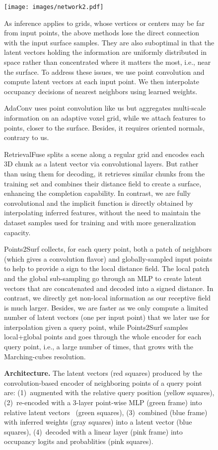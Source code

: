 \documentclass[10pt,twocolumn,letterpaper]{article}
\begin{document}
\begin{figure}[t]
\begin{figure*}
    \centering
    \texttt{[image: images/network2.pdf]}
    \vspace{-6mm}
    \caption{\textbf{Architecture.} The latent vectors  (red squares) produced by the convolution-based encoder  of  neighboring points  of a query point  are:
    (1)~augmented with the relative query position  (yellow squares), 
    (2)~re-encoded with a 3-layer point-wise MLP  (green frame) into relative latent vectors~ (green squares), 
    (3)~combined (blue frame) with inferred weights  (gray squares) into a latent vector  (blue squares),
    (4)~decoded with a linear layer  (pink frame) into occupancy logits  and probablities  (pink squares).
    } 
    \label{fig:decoder}
    \vspace{-2mm}
\end{figure*}


As inference applies to grids, whose vertices or centers may be far from input points, the above methods lose the direct connection with the input surface samples. They are also suboptimal in that the latent vectors holding the information are uniformly distributed in space rather than concentrated where it matters the most, i.e., near the surface.
To address these issues, we use point convolution and compute latent vectors at each input point. We then interpolate occupancy decisions of nearest neighbors using learned weights.

AdaConv \cite{Ummenhofer2021Adaptive} uses point convolution like us but aggregates multi-scale information on an adaptive voxel grid, while we attach features to points, closer to the surface. Besides, it requires oriented normals, contrary to us.

RetrievalFuse \cite{Siddiqui2021RetrievalFuse} splits a scene along a regular grid and encodes each 3D chunk as a latent vector via convolutional layers. But rather than using them for decoding, it retrieves similar chunks from the training set and combines their distance field to create a surface, enhancing the completion capability.
In contrast, we are fully convolutional and the implicit function is directly obtained by interpolating inferred features, without the need to maintain the dataset samples used for training and with more generalization capacity.

Points2Surf \cite{Erler2020Points2Surf} collects, for each query point, both a patch of neighbors (which gives a convolution flavor) and globally-sampled input points to help to provide a sign to the local distance field. The local patch and the global sub-sampling go through an MLP to create latent vectors that are concatenated and decoded into a signed distance.
In contrast, we directly get non-local information as our receptive field is much larger. Besides, we are faster as we only compute a limited number of latent vectors (one per input point) that we later use for interpolation given a query point, while Points2Surf samples local+global points and goes through the whole encoder for each query point, i.e., a large number of times, that grows with the Marching-cubes resolution.


\end{figure}
\end{document}
